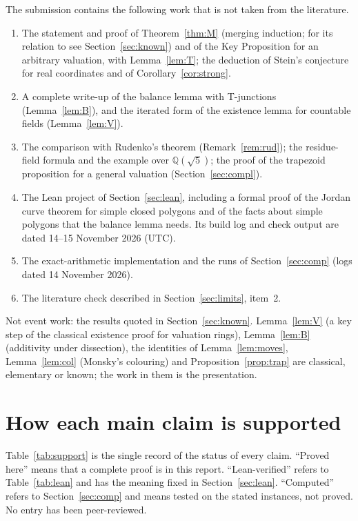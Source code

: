\documentclass[11pt]{article}
\theoremstyle{definition}
\newcommand{\Q}{\mathbb{Q}}
\begin{document}
The submission contains the following work that is not taken from the literature.
\begin{enumerate}
\item The statement and proof of Theorem~\ref{thm:M} (merging induction; for its relation to
\cite{Rud12} see Section~\ref{sec:known}) and of the Key Proposition for
an arbitrary valuation, with Lemma~\ref{lem:T}; the deduction of Stein's conjecture for real
coordinates and of Corollary~\ref{cor:strong}.
\item A complete write-up of the balance lemma with T-junctions (Lemma~\ref{lem:B}), and the
iterated form of the existence lemma for countable fields (Lemma~\ref{lem:V}).
\item The comparison with Rudenko's theorem (Remark~\ref{rem:rud}); the residue-field formula and
the example over $\Q(\sqrt5)$; the proof of the trapezoid proposition for a general valuation
(Section~\ref{sec:compl}).
\item The Lean project of Section~\ref{sec:lean}, including a formal proof of the Jordan curve theorem for
simple closed polygons and of the facts about simple polygons that the balance lemma needs. Its build log and check output are dated 14--15 November
2026 (UTC).
\item The exact-arithmetic implementation and the runs of Section~\ref{sec:comp} (logs dated
14 November 2026).
\item The literature check described in Section~\ref{sec:limits}, item~2.
\end{enumerate}
Not event work: the results quoted in Section~\ref{sec:known}. Lemma~\ref{lem:V} (a key step of the
classical existence proof for valuation rings), Lemma~\ref{lem:B} (additivity under dissection),
the identities of Lemma~\ref{lem:moves}, Lemma~\ref{lem:col} (Monsky's colouring) and
Proposition~\ref{prop:trap} are classical, elementary or known; the work in them is the
presentation.

\section{How each main claim is supported}\label{sec:support}

Table~\ref{tab:support} is the single record of the status of every claim. ``Proved here'' means
that a complete proof is in this report. ``Lean-verified'' refers to Table~\ref{tab:lean} and has
the meaning fixed in Section~\ref{sec:lean}. ``Computed'' refers to Section~\ref{sec:comp} and means
tested on the stated instances, not proved. No entry has been peer-reviewed.
\end{document}
